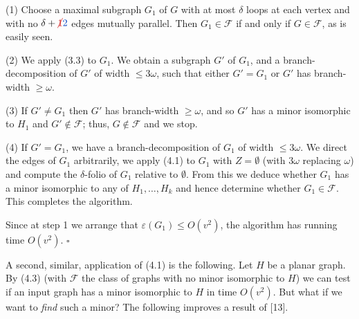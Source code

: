 \hspace*{12pt}(1) Choose a maximal subgraph $G_1$ of $G$ with at most $\delta$ loops at each vertex and with no $\delta + \delm{1}\fix{2}$ edges mutually parallel. Then $G_1 \in \mathcal{F}$ if and only if $G \in \mathcal{F}$, as is easily seen.

\hspace*{12pt}(2) We apply (3.3) to $G_1$. We obtain a subgraph $G'$ of $G_1$, and a branch-decomposition of $G'$ of width $\le 3\omega$, such that either $G' = G_1$ or $G'$ has branch-width $\ge \omega$.

\hspace*{12pt}(3) If $G' \ne G_1$ then $G'$ has branch-width $\ge \omega$, and so $G'$ has a minor isomorphic to $H_1$ and $G' \notin \mathcal{F}$; thus, $G \notin \mathcal{F}$ and we stop.

\hspace*{12pt}(4) If $G' = G_1$, we have a branch-decomposition of $G_1$ of width $\le 3\omega$. We direct the edges of $G_1$ arbitrarily, we apply (4.1) to $G_1$ with $Z = \emptyset$ (with $3\omega$ replacing $\omega$) and compute the $\delta$-folio of $G_1$ relative to $\emptyset$. From this we deduce whether $G_1$ has a minor isomorphic to any of $H_1, \dots, H_k$ and hence determine whether $G_1 \in \mathcal{F}$. This completes the algorithm.

Since at step 1 we arrange that $\varepsilon(G_1) \le O(v^2)$, the algorithm has running time $O(v^2)$. $\square$

A second, similar, application of (4.1) is the following. Let $H$ be a planar graph. By (4.3) (with $\mathcal{F}$ the class of graphs with no minor isomorphic to $H$) we can test if an input graph has a minor isomorphic to $H$ in time $O(v^2)$. But what if we want to \textit{find} such a minor? The following improves a result of [13].

